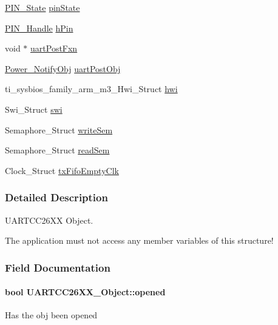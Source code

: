 \begin{DoxyCompactItemize}
\item 
\hyperlink{_p_i_n_8h_a36ef69d50df6baa6973482669c24a522}{P\+I\+N\+\_\+\+State} \hyperlink{struct_u_a_r_t_c_c26_x_x___object_a5a12b2fd3f28ae68e2c4c6ddd2f38eb8}{pin\+State}
\item 
\hyperlink{_p_i_n_8h_afb2de52b054638f63c39df1f30a0d88d}{P\+I\+N\+\_\+\+Handle} \hyperlink{struct_u_a_r_t_c_c26_x_x___object_acf3b45b67310e399f3fcf6ad449fa445}{h\+Pin}
\item 
void $\ast$ \hyperlink{struct_u_a_r_t_c_c26_x_x___object_a990a1d69fb8edf1e88f47e01f7de4e5f}{uart\+Post\+Fxn}
\item 
\hyperlink{struct_power___notify_obj}{Power\+\_\+\+Notify\+Obj} \hyperlink{struct_u_a_r_t_c_c26_x_x___object_a06f854831de50d17f7249224f560cdd5}{uart\+Post\+Obj}
\item 
ti\+\_\+sysbios\+\_\+family\+\_\+arm\+\_\+m3\+\_\+\+Hwi\+\_\+\+Struct \hyperlink{struct_u_a_r_t_c_c26_x_x___object_adfa38511dd1f8c470bb7f80afdfcd6eb}{hwi}
\item 
Swi\+\_\+\+Struct \hyperlink{struct_u_a_r_t_c_c26_x_x___object_a2697a8c771718dfa23ddca3f45e124f4}{swi}
\item 
Semaphore\+\_\+\+Struct \hyperlink{struct_u_a_r_t_c_c26_x_x___object_a216c349e650909bd84072c076051117d}{write\+Sem}
\item 
Semaphore\+\_\+\+Struct \hyperlink{struct_u_a_r_t_c_c26_x_x___object_ab81ce13969ecc77d764000ea53fb23d2}{read\+Sem}
\item 
Clock\+\_\+\+Struct \hyperlink{struct_u_a_r_t_c_c26_x_x___object_a97be7390556f78f9361505c4ee860469}{tx\+Fifo\+Empty\+Clk}
\end{DoxyCompactItemize}


\subsubsection{Detailed Description}
U\+A\+R\+T\+C\+C26\+X\+X Object. 

The application must not access any member variables of this structure! 

\subsubsection{Field Documentation}
\paragraph[{opened}]{\setlength{\rightskip}{0pt plus 5cm}bool U\+A\+R\+T\+C\+C26\+X\+X\+\_\+\+Object\+::opened}\label{struct_u_a_r_t_c_c26_x_x___object_aabff5933f6661e2ebdbd8b001a6c12d7}
Has the obj been opened 
